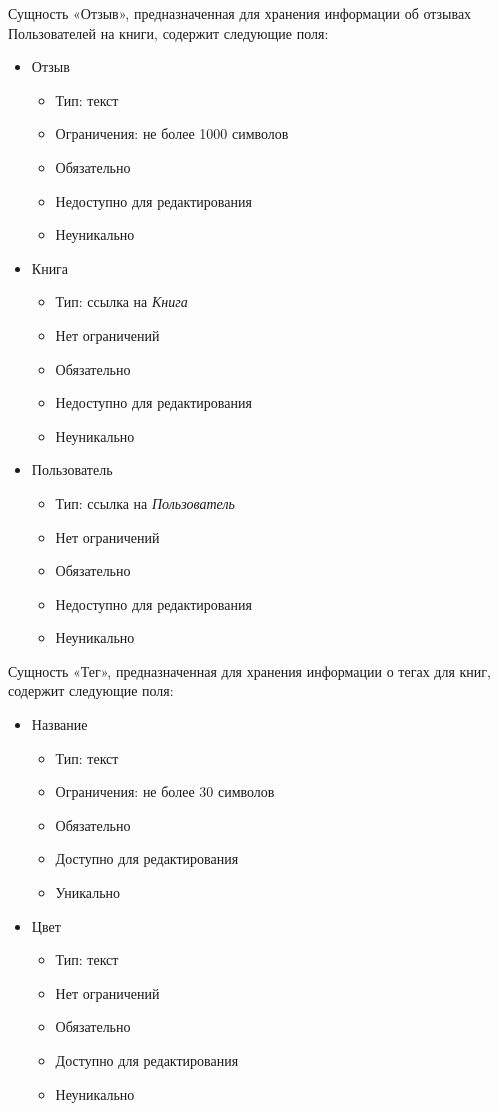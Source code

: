 \documentclass[data-specification.tex]{subfiles}
\begin{document}
\par
Сущность «Отзыв», предназначенная для хранения информации об отзывах Пользователей на книги, содержит следующие поля:
\begin{itemize}
    \item Отзыв
    \begin{itemize}
        \item Тип: текст
        \item Ограничения: не более 1000 символов
        \item Обязательно
        \item Недоступно для редактирования
        \item Неуникально
    \end{itemize}
    \item Книга
    \begin{itemize}
        \item Тип: ссылка на \textsl{Книга}
        \item Нет ограничений
        \item Обязательно
        \item Недоступно для редактирования
        \item Неуникально
    \end{itemize}
    \item Пользователь
    \begin{itemize}
        \item Тип: ссылка на \textsl{Пользователь}
        \item Нет ограничений
        \item Обязательно
        \item Недоступно для редактирования
        \item Неуникально
    \end{itemize}
\end{itemize}
\par
Сущность «Тег», предназначенная для хранения информации о тегах для книг, содержит следующие поля:
\begin{itemize}
    \item Название
    \begin{itemize}
        \item Тип: текст
        \item Ограничения: не более 30 символов
        \item Обязательно
        \item Доступно для редактирования
        \item Уникально
    \end{itemize}
    \item Цвет
    \begin{itemize}
        \item Тип: текст
        \item Нет ограничений
        \item Обязательно
        \item Доступно для редактирования
        \item Неуникально
    \end{itemize}
\end{itemize}

\clearpage
\end{document}
